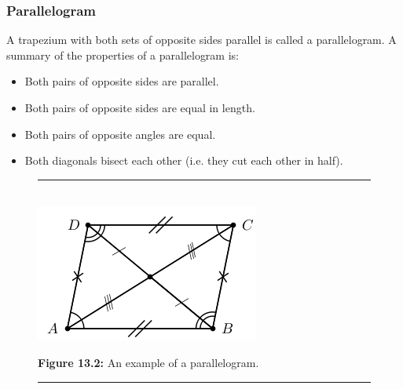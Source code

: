 \subsubsection{ Parallelogram}
A trapezium with both sets of opposite sides parallel is called a parallelogram.
A summary of the properties of a parallelogram is:\par 
\begin{itemize}[noitemsep]
\item Both pairs of opposite sides are parallel.
\item Both pairs of opposite sides are equal in length.
\item Both pairs of opposite angles are equal.
\item Both diagonals bisect each other (i.e. they cut each other in half).
\end{itemize}
\setcounter{subfigure}{0}
\begin{figure}[H] %
\begin{center}
\rule[.1in]{\figurerulewidth}{.005in} \\
\label{m39354*uid61!!!underscore!!!media}\label{
m39354*uid61!!!underscore!!!printimage}\includegraphics{
col11306.imgs/m39354_MG10C13_041.png} %
\vspace{2pt}
\vspace{\rubberspace}\par \begin{cnxcaption}
\small \textbf{Figure 13.2: }An example of a parallelogram.
\end{cnxcaption}
\vspace{.1in}
\rule[.1in]{\figurerulewidth}{.005in} \\
\end{center}
\end{figure}       

